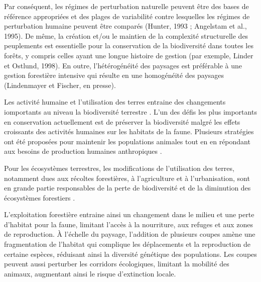 Par conséquent, les régimes de perturbation naturelle peuvent être des bases de référence appropriées et des plages de variabilité contre lesquelles les régimes de perturbation humaine peuvent être comparés (Hunter, 1993 ; Angelstam et al., 1995).
De même, la création et/ou le maintien de la complexité structurelle des peuplements est essentielle pour la conservation de la biodiversité dans toutes les forêts, y compris celles ayant une longue histoire de gestion (par exemple, Linder et Ostlund, 1998). 
En outre, l'hétérogénéité des paysages est préférable à une gestion forestière intensive qui résulte en une homogénéité des paysages (Lindenmayer et Fischer, en presse).



Les activité humaine et l'utilisation des terres entraine des changements iomportants au niveau la biodiversité terrestre \citep{Newbold2015Globaleffects}. 
L'un des défis les plus importants en conservation actuellement est de préserver la biodiversité malgré les effets croissants des activités humaines sur les habitats de la faune.
Plusieurs stratégies ont été proposées pour maintenir les populations animales tout en en répondant aux besoins de production humaines anthropiques \citep{Lindenmayer2006Generalmanagement}.

Pour les écosystèmes terrestres, les modifications de l'utilisation des terres, notamment dues aux récoltes forestières, à l'agriculture et à l'urbanisation, sont en grande partie responsables de la perte de biodiversité et de la diminution des écosystèmes forestiers \citep{Sala2000Globalbiodiversity,Naeem2012functionsbiological,Bichet2016Maintaininganimal}.

L'exploitation forestière entraine ainsi un changement dans le milieu et une perte d'habitat pour la faune, limitant l'accès à la nourriture, aux refuges et aux zones de reproduction. 
À l'échelle du paysage, l'addition de plusieurs coupes amène une fragmentation de l'habitat qui complique les déplacements et la reproduction de certaine espèces, réduisant ainsi la diversité génétique des populations. 
Les coupes peuvent aussi perturber les corridors écologiques, limitant la mobilité des animaux, augmentant ainsi le risque d'extinction locale. 

